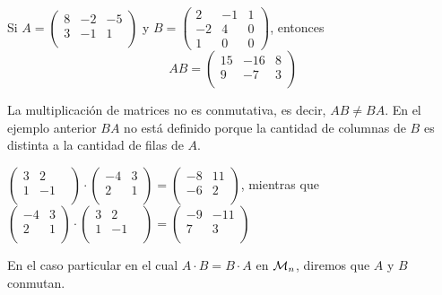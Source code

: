
\begin{ejem}
Si $A=\begin{pmatrix}
    8 & -2 & -5\\
    3 & -1 & 1 \\
    \end{pmatrix}$ y $B=\begin{pmatrix}
    2 & -1 &1\\
    -2 & 4 &0\\
    1 &0 &0
    \end{pmatrix}$, entonces 
    \[AB=\begin{pmatrix}
    15 & -16 &8\\
    9 & -7 &3\\
    \end{pmatrix}\]
\end{ejem}


La multiplicación de matrices no es conmutativa, es decir, $AB \not= BA$. En el ejemplo anterior $BA$ no está definido porque la cantidad de columnas  de $B$ es distinta a la cantidad de filas de $A$.


\begin{ejem}
    $\begin{pmatrix}
   3 & 2 & \\
    1 & -1  \\
    \end{pmatrix}\cdot \begin{pmatrix}
    -4 & 3 \\
    2 & 1  \\
    \end{pmatrix}=\begin{pmatrix}
    -8 & 11 \\
    -6 & 2  \\
    \end{pmatrix}$, mientras que 
     $\begin{pmatrix}
    -4 & 3 \\
    2 & 1  \\
    \end{pmatrix}\cdot\begin{pmatrix}
   3 & 2 & \\
    1 & -1  \\
    \end{pmatrix} =\begin{pmatrix}
    -9 & -11 \\
    7 & 3  \\
    \end{pmatrix}$
\end{ejem}
En el caso particular en el cual $A\cdot B = B\cdot A$ en $\mathcal{M}_n$, diremos que $A$ y $B$ conmutan.

